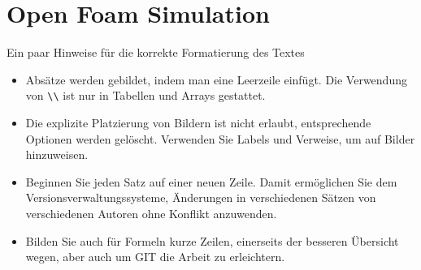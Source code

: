 %
%
%
%
\chapter{Open Foam Simulation\label{chapter:openfoam}}
\begin{refsection}

Ein paar Hinweise für die korrekte Formatierung des Textes
\begin{itemize}
\item
Absätze werden gebildet, indem man eine Leerzeile einfügt.
Die Verwendung von \verb+\\+ ist nur in Tabellen und Arrays gestattet.
\item
Die explizite Platzierung von Bildern ist nicht erlaubt, entsprechende
Optionen werden gelöscht. 
Verwenden Sie Labels und Verweise, um auf Bilder hinzuweisen.
\item
Beginnen Sie jeden Satz auf einer neuen Zeile. 
Damit ermöglichen Sie dem Versionsverwaltungssysteme, Änderungen
in verschiedenen Sätzen von verschiedenen Autoren ohne Konflikt 
anzuwenden.
\item 
Bilden Sie auch für Formeln kurze Zeilen, einerseits der besseren
Übersicht wegen, aber auch um GIT die Arbeit zu erleichtern.
\end{itemize}






\printbibliography[heading=subbibliography]
\end{refsection}
